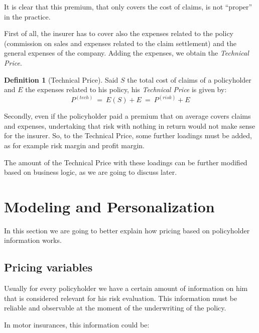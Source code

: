 \documentclass[a4paper, nobind]{templates/ociamthesis}
\theoremstyle{definition}
\newtheorem{definition}{Definition}[chapter]
\theoremstyle{definition}
\theoremstyle{definition}
\theoremstyle{remark}
\begin{document}
It is clear that this premium, that only covers the cost of claims, is not ``proper'' in the practice.

First of all, the insurer has to cover also the expenses related to the policy (commission on sales and expenses related to the claim settlement) and the general expenses of the company. Adding the expenses, we obtain the \emph{Technical Price}.

\begin{definition}[Technical Price]
\label{def:technical-price} \iffalse (Technical Price) \fi{} Said \(S\) the total cost of claims of a policyholder and \(E\) the expenses related to his policy, his \emph{Technical Price} is given by:
\[
P^{(tech)} \ = \ E(S) + E \ = \ P^{(risk)} + E
\]
\end{definition}

Secondly, even if the policyholder paid a premium that on average covers claims and expenses, undertaking that risk with nothing in return would not make sense for the insurer. So, to the Technical Price, some further loadings must be added, as for example risk margin and profit margin.

The amount of the Technical Price with these loadings can be further modified based on business logic, as we are going to discuss later.

\hypertarget{chap:personalization}{%
\section{Modeling and Personalization}\label{chap:personalization}}

In this section we are going to better explain how pricing based on policyholder information works.

\hypertarget{chap:pricing-variables}{%
\subsection{Pricing variables}\label{chap:pricing-variables}}

Usually for every policyholder we have a certain amount of information on him that is considered relevant for his risk evaluation. This information must be reliable and observable at the moment of the underwriting of the policy.

In motor insurances, this information could be:
\end{document}
